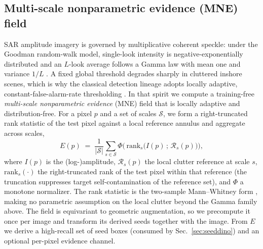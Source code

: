 \subsection{Multi-scale nonparametric evidence (MNE) field}
\label{sec:mne}
SAR amplitude imagery is governed by multiplicative coherent speckle: under the Goodman random-walk model, single-look intensity is negative-exponentially distributed and an $L$-look average follows a Gamma law with mean one and variance $1/L$ \cite{goodman1976speckle,oliver2004sar}. A fixed global threshold degrades sharply in cluttered inshore scenes, which is why the classical detection lineage adopts locally adaptive, constant-false-alarm-rate thresholding \cite{finn1968cfar}. In that spirit we compute a training-free \emph{multi-scale nonparametric evidence} (MNE) field that is locally adaptive and distribution-free. For a pixel $p$ and a set of scales $\mathcal{S}$, we form a right-truncated rank statistic of the test pixel against a local reference annulus and aggregate across scales,
\begin{equation}
E(p) \;=\; \frac{1}{|\mathcal{S}|}\sum_{s\in\mathcal{S}} \Phi\!\Big(\,\mathrm{rank}_{s}\big(I(p)\,;\,\mathcal{R}_{s}(p)\big)\Big),
\label{eq:mne}
\end{equation}
where $I(p)$ is the (log-)amplitude, $\mathcal{R}_{s}(p)$ the local clutter reference at scale $s$, $\mathrm{rank}_{s}(\cdot)$ the right-truncated rank of the test pixel within that reference (the truncation suppresses target self-contamination of the reference set), and $\Phi$ a monotone normalizer. The rank statistic is the two-sample Mann--Whitney form \cite{mann1947whitney}, making no parametric assumption on the local clutter beyond the Gamma family above. The field is equivariant to geometric augmentation, so we precompute it once per image and transform its derived seeds together with the image. From $E$ we derive a high-recall set of seed boxes (consumed by Sec.~\ref{sec:seeddino}) and an optional per-pixel evidence channel.

